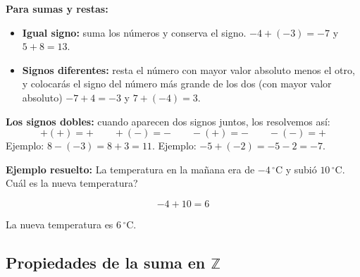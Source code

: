 \documentclass[12pt, letterpaper]{article}
\newcommand{\Z}{\mathbb{Z}}
\begin{document}
\begin{cuadrosolucion}
  \textbf{Para sumas y restas:}
  \begin{itemize}
    \item \textbf{Igual signo:} suma los números y conserva el signo.
          \quad $-4 + (-3) = -7$ \quad y \quad $5 + 8 = 13$.
    \item \textbf{Signos diferentes:} resta el número con mayor valor absoluto menos el otro, y colocarás el signo del número más grande de los dos (con mayor valor absoluto)
          \quad $-7 + 4 = -3$ \quad y \quad $7 + (-4) = 3$.
  \end{itemize}
\end{cuadrosolucion}


\begin{cuadroadvertencia}
  \textbf{Los signos dobles:} cuando aparecen dos signos juntos, los resolvemos así:
  \[
    + (+) = + \qquad +(-) = - \qquad -(+) = - \qquad -(-) = +
  \]
  Ejemplo: $8 - (-3) = 8 + 3 = 11$. \quad Ejemplo: $-5 + (-2) = -5 - 2 = -7$.
\end{cuadroadvertencia}

\noindent\textbf{Ejemplo resuelto:} La temperatura en la mañana era de $-4\,^{\circ}$C y subió $10\,^{\circ}$C. \textquestiondown Cuál es la nueva temperatura?

\[
  -4 + 10 = 6
\]

\noindent La nueva temperatura es $6\,^{\circ}$C.

\subsection{Propiedades de la suma en $\Z$}
\end{document}
